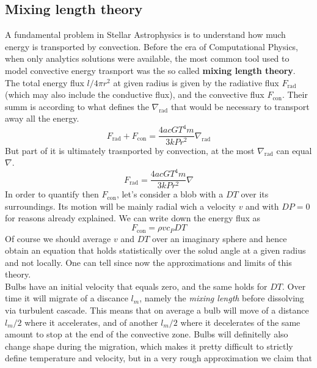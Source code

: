 \documentclass[11pt]{article}
\begin{document}
\subsection{Mixing length theory}
A fundamental problem in Stellar Astrophysics is to understand how much energy is transported by convection. Before the era of Computational Physics, when only analytics solutions were available, the most common tool used to model convective energy trasnport was the so called \textbf{mixing length theory}. \\
The total energy flux $l/4 \pi r^2$ at given radius is given by the radiative flux $F_{\mathrm{rad}}$ (which may also include the conductive flux), and the convective flux $F_{\mathrm{con}}$. Their summ is according to \label{nablarad} what defines the $\nabla_{\mathrm{rad}}$ that would be necessary to transport away all the energy.
\begin{equation}\label{7.1}
F_{\mathrm{rad}}+ F_{\mathrm{con}}= \frac{4 a c G T^4 m }{3 k P r^2} \nabla_{\mathrm{rad}}
\end{equation}
But part of it is ultimately trasnported by convection, at the most $\nabla_{\mathrm{rad}}$ can equal $\nabla$. 
\begin{equation}\label{7.2}
F_{\mathrm{rad}}= \frac{4 a c G T^4 m}{3 k P r^2} \nabla
\end{equation}
In order to quantify then $F_{\mathrm{con}}$, let's consider a blob with a $DT$ over its surroundings. Its motion will be mainly radial wich a velocity $v$ and with $DP=0$ for reasons already explained. We can write down the energy flux as
\begin{equation}\label{fconv}
	F_{\mathrm{con}}=\rho  v  c_P  DT
\end{equation}
Of course we should average $v$ and $DT$ over an imaginary sphere and hence obtain an equation that holds statistically over the solud angle at a given radius and not locally. One can tell since now the approximations and limits of this theory. \\
Bulbs have an initial velocity that equals zero, and the same holds for $DT$. Over time it will migrate of a discance $l_m$, namely the \textit{mixing length} before dissolving via turbulent cascade. This means that on average a bulb will move of a distance $l_m/2$ where it accelerates, and of another $l_m/2$ where it decelerates of the same amount to stop at the end of the convective zone. Bulbs will definitelly also change shape during the migration, which makes it pretty difficult to strictly define temperature and velocity, but in a very rough approximation we claim that
\end{document}
